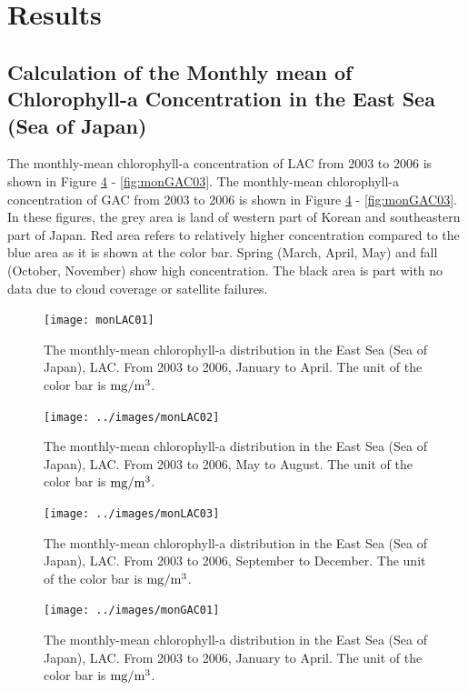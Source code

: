 
\section{Results}

\subsection{Calculation of the Monthly mean of Chlorophyll-a Concentration in the East Sea (Sea of Japan)}
The monthly-mean chlorophyll-a concentration of LAC from 2003 to 2006 is shown in Figure \ref{fig:monGAC01} - \ref{fig:monGAC03}. The monthly-mean chlorophyll-a concentration of GAC from 2003 to 2006 is shown in Figure \ref{fig:monGAC01} - \ref{fig:monGAC03}. In these figures, the grey area is land of western part of Korean and southeastern part of Japan. Red area refers to relatively higher concentration compared to the blue area as it is shown at the color bar. Spring (March, April, May) and fall (October, November) show high concentration. The black area is part with no data due to cloud coverage or satellite failures. 

\begin{figure}[p]
	\centering
	\texttt{[image: monLAC01]}\\
	\caption{The monthly-mean chlorophyll-a distribution in the East Sea (Sea of Japan), LAC. From 2003 to 2006, January to April. The unit of the color bar is $\rm mg/m^3$.}
	\label{fig:monLAC01}
\end{figure}


\begin{figure}[p]
	\centering
	\texttt{[image: ../images/monLAC02]}\\
	\caption{The monthly-mean chlorophyll-a distribution in the East Sea (Sea of Japan), LAC. From 2003 to 2006, May to August. The unit of the color bar is $\rm mg/m^3$.}
	\label{fig:monLAC02}
\end{figure}

\begin{figure}[p]
	\centering
	\texttt{[image: ../images/monLAC03]}\\
	\caption{The monthly-mean chlorophyll-a distribution in the East Sea (Sea of Japan), LAC. From 2003 to 2006, September to December. The unit of the color bar is $\rm mg/m^3$.}
	\label{fig:monLAC03}
\end{figure}


\begin{figure}[p]
	\centering
	\texttt{[image: ../images/monGAC01]}\\
	\caption{The monthly-mean chlorophyll-a distribution in the East Sea (Sea of Japan), LAC. From 2003 to 2006, January to April. The unit of the color bar is $\rm mg/m^3$.}
	\label{fig:monGAC01}
\end{figure}


